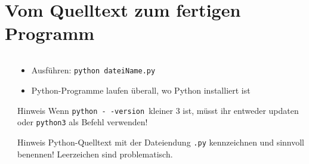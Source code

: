 \section{Vom Quelltext zum fertigen Programm}
\begin{frame}
    \slidehead

    \begin{columns}[T]
        \begin{column}{.4\textwidth}
        \end{column}
        \begin{column}{.6\textwidth}
            \begin{itemize}
                \item Ausführen: \texttt{python dateiName.py}
                \item Python-Programme laufen überall, wo Python installiert ist
            \end{itemize}
            \begin{block}{Hinweis}
                Wenn \texttt{python -\,-version}\, kleiner 3 ist, müsst ihr entweder updaten oder \texttt{python3} als Befehl verwenden!
            \end{block}
            \begin{block}{Hinweis}
                Python-Quelltext mit der Dateiendung \texttt{.py} kennzeichnen und sinnvoll benennen! Leerzeichen sind problematisch.
            \end{block}
        \end{column}
    \end{columns}
\end{frame}

